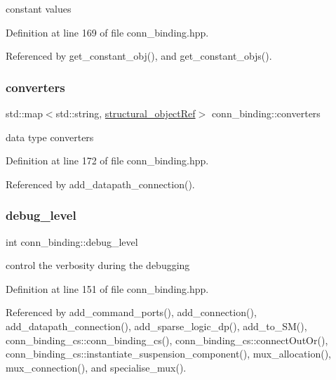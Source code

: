 constant values 



Definition at line 169 of file conn\+\_\+binding.\+hpp.



Referenced by get\+\_\+constant\+\_\+obj(), and get\+\_\+constant\+\_\+objs().

\mbox{\label{classconn__binding_a00109a76f23a1c32f8c7d1a85bf2c290}} 
\subsubsection{\texorpdfstring{converters}{converters}}
{\footnotesize\ttfamily std\+::map$<$std\+::string, \hyperlink{structural__objects_8hpp_a8ea5f8cc50ab8f4c31e2751074ff60b2}{structural\+\_\+object\+Ref}$>$ conn\+\_\+binding\+::converters\hspace{0.3cm}{\ttfamily [protected]}}



data type converters 



Definition at line 172 of file conn\+\_\+binding.\+hpp.



Referenced by add\+\_\+datapath\+\_\+connection().

\mbox{\label{classconn__binding_af0b05f77221d5cd5eff651b767d039d7}} 
\subsubsection{\texorpdfstring{debug\+\_\+level}{debug\_level}}
{\footnotesize\ttfamily int conn\+\_\+binding\+::debug\+\_\+level\hspace{0.3cm}{\ttfamily [protected]}}



control the verbosity during the debugging 



Definition at line 151 of file conn\+\_\+binding.\+hpp.



Referenced by add\+\_\+command\+\_\+ports(), add\+\_\+connection(), add\+\_\+datapath\+\_\+connection(), add\+\_\+sparse\+\_\+logic\+\_\+dp(), add\+\_\+to\+\_\+\+S\+M(), conn\+\_\+binding\+\_\+cs\+::conn\+\_\+binding\+\_\+cs(), conn\+\_\+binding\+\_\+cs\+::connect\+Out\+Or(), conn\+\_\+binding\+\_\+cs\+::instantiate\+\_\+suspension\+\_\+component(), mux\+\_\+allocation(), mux\+\_\+connection(), and specialise\+\_\+mux().


